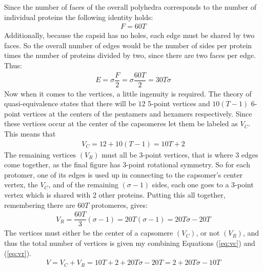 \documentclass[12pt,letter]{article}
\begin{document}
Since the number of faces of the overall polyhedra corresponds to the number of individual proteins the following identity holds:
\begin{align}
	F = 60 T
	\label{eq:f}
\end{align}
%
Additionally, because the capsid has no holes, each edge must be shared by two faces. So the overall number of edges would be the number of sides per protein times the number of proteins divided by two, since there are two faces per edge. Thus:
\begin{align}
	E = \sigma \dfrac F 2 = \sigma \dfrac{60 T} {2} = 30 T \sigma
	\label{eq:e}
\end{align}
%
Now when it comes to the vertices, a little ingenuity is required. The theory of quasi-equivalence states that there will be $12$ 5-point vertices and $10(T-1)$ 6-point vertices at the centers of the pentamers and hexamers respectively. Since these vertices occur at the center of the capsomeres let them be labeled as $V_C$. This means that
\begin{align}
	V_C = 12 + 10(T - 1) = 10 T + 2
	\label{eq:vc}
\end{align}
%
The remaining vertices $(V_R)$ must all be 3-point vertices, that is where 3 edges come together, as the final figure has 3-point rotational symmetry. So for each protomer, one of its edges is used up in connecting to the capsomer's center vertex, the $V_C$, and of the remaining $(\sigma - 1)$ sides, each one goes to a 3-point vertex which is shared with 2 other proteins. Putting this all together, remembering there are $60 T$ protomeres, gives:
\begin{align}
	V_R = \dfrac{60 T}{3} (\sigma - 1) = 20 T (\sigma - 1) = 20T\sigma - 20T
	\label{eq:vr}
\end{align}
%
The vertices must either be the center of a capsomere $(V_C)$, or not $(V_R)$, and thus the total number of vertices is given my combining Equations (\ref{eq:vc}) and (\ref{eq:vr}).
\begin{align}
	V = V_C + V_R = 10T + 2 + 20T\sigma - 20T = 2 + 20T\sigma - 10T
	\label{eq:v}
\end{align}
\end{document}
